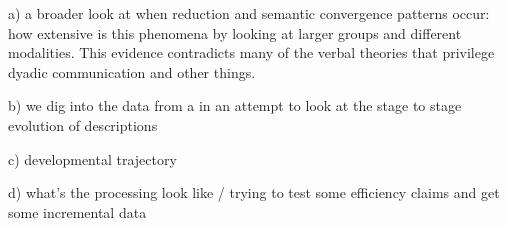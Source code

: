 \documentclass[]{article}
\begin{document}
	a) a broader look at when reduction and semantic convergence patterns occur: how extensive is this phenomena by looking at larger groups and different modalities. This evidence contradicts many of the verbal theories that privilege dyadic communication and other things. 
	
	b) we dig into the data from a in an attempt to look at the stage to stage evolution of descriptions
	
	c) developmental trajectory
	
	d) what's the processing look like / trying to test some efficiency claims and get some incremental data
	
%	
%	
%
%
%

\printbibliography
\end{document}
